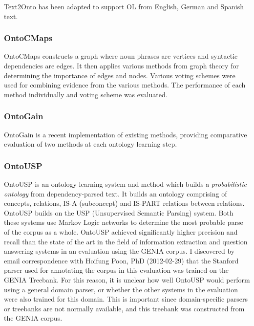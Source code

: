 \documentclass[a4paper]{report}
\newcommand{\todo}[1]{}
\begin{document}
Text2Onto has been adapted to support OL from English, German and Spanish text.

\subsubsection{OntoCMaps}

OntoCMaps constructs a graph where noun phrases are vertices and syntactic dependencies are edges.
It then applies various methods from graph theory for determining the importance of edges and nodes.
Various voting schemes were used for combining evidence from the various methods.
The performance of each method individually and voting scheme was evaluated.

\subsubsection{OntoGain}
\label{sec:background:ontogain}

OntoGain is a recent implementation of existing methods, providing comparative evaluation of two methods at each ontology learning step.

\subsubsection{OntoUSP}

OntoUSP is an ontology learning system and method which builds a \emph{probabilistic ontology} from dependency-parsed text\cite{Poon2010OntoUSP}.
It builds an ontology comprising of concepts, relations, IS-A (subconcept) and IS-PART relations between relations.
OntoUSP builds on the USP (Unsupervised Semantic Parsing) system\cite{Poon09USP}.
Both these systems use Markov Logic networks to determine the most probable parse of the corpus as a whole\todo{explain this more}.
OntoUSP achieved significantly higher precision and recall than the state of the art in the field of information extraction and question answering systems in an evaluation using the GENIA\citep{KimEtAl03GeniaCorpus} corpus\cite{Poon2010OntoUSP}.
I discovered by email correspondence with Hoifung Poon, PhD (2012-02-29) that the Stanford parser\cite{Klein03PCFGParser} used for annotating the corpus in this evaluation was trained on the GENIA Treebank\cite{Tatseisi05GENIATB}.
For this reason, it is unclear how well OntoUSP would perform using a general domain parser, or whether the other systems in the evaluation were also trained for this domain.
This is important since domain-specific parsers or treebanks are not normally available, and this treebank was constructed from the GENIA corpus.
\end{document}
